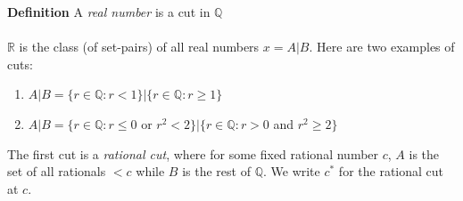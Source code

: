 \documentclass{report}
\begin{document}
\textbf{Definition} A \textit{real number} is a cut in $\mathbb{Q}$\\
\vspace{1mm}\\
$\mathbb{R}$ is the class (of set-pairs) of all real numbers $x=A|B$. Here are two examples of cuts:
\begin{enumerate}
\item $A|B=\{r\in\mathbb{Q}:r<1\}|\{r\in\mathbb{Q}:r\geq1\}$
\item $A|B=\{r\in\mathbb{Q}:r\leq0$ or $r^2<2\}|\{r\in\mathbb{Q}:r>0$ and $r^2\geq2\}$
\end{enumerate}
The first cut is a \textit{rational cut}, where for some fixed rational number $c$, $A$ is the set of all rationals
$<c$ while $B$ is the rest of $\mathbb{Q}$. We write $c^*$ for the rational cut at $c$.
\end{document}
